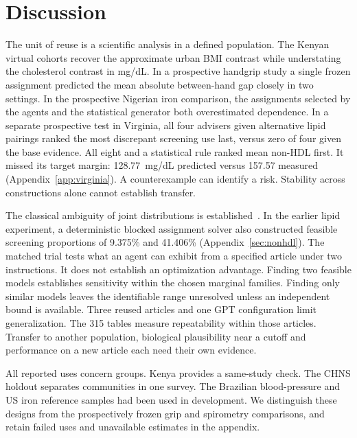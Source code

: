 \documentclass[sigconf,anonymous,review]{acmart}
\begin{document}
\section{Discussion}
The unit of reuse is a scientific analysis in a defined population. The Kenyan virtual cohorts recover the approximate urban BMI contrast while understating the cholesterol contrast in mg/dL. In a prospective handgrip study a single frozen assignment predicted the mean absolute between-hand gap closely in two settings. In the prospective Nigerian iron comparison, the assignments selected by the agents and the statistical generator both overestimated dependence. In a separate prospective test in Virginia, all four advisers given alternative lipid pairings ranked the most discrepant screening use last, versus zero of four given the base evidence. All eight and a statistical rule ranked mean non-HDL first. It missed its target margin: 128.77~mg/dL predicted versus 157.57 measured (Appendix~\ref{app:virginia}). A counterexample can identify a risk. Stability across constructions alone cannot establish transfer.

The classical ambiguity of joint distributions is established~\cite{makarov,zaev}. In the earlier lipid experiment, a deterministic blocked assignment solver also constructed feasible screening proportions of 9.375\% and 41.406\% (Appendix~\ref{sec:nonhdl}). The matched trial tests what an agent can exhibit from a specified article under two instructions. It does not establish an optimization advantage. Finding two feasible models establishes sensitivity within the chosen marginal families. Finding only similar models leaves the identifiable range unresolved unless an independent bound is available. Three reused articles and one GPT configuration limit generalization. The 315 tables measure repeatability within those articles. Transfer to another population, biological plausibility near a cutoff and performance on a new article each need their own evidence.

All reported uses concern groups. Kenya provides a same-study check. The CHNS holdout separates communities in one survey. The Brazilian blood-pressure and US iron reference samples had been used in development. We distinguish these designs from the prospectively frozen grip and spirometry comparisons, and retain failed uses and unavailable estimates in the appendix.



\clearpage
\appendix

\end{document}
